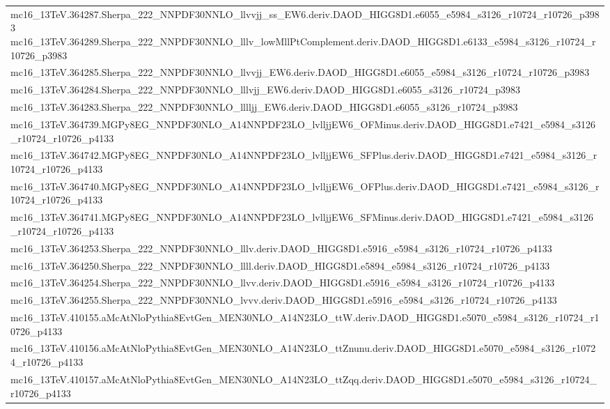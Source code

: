 \begin{adjustwidth}{-3em}{-3em}
\begin{longtable}{l}
mc16\_13TeV.364287.Sherpa\_222\_NNPDF30NNLO\_llvvjj\_ss\_EW6.deriv.DAOD\_HIGG8D1.e6055\_e5984\_s3126\_r10724\_r10726\_p3983
mc16\_13TeV.364289.Sherpa\_222\_NNPDF30NNLO\_lllv\_lowMllPtComplement.deriv.DAOD\_HIGG8D1.e6133\_e5984\_s3126\_r10724\_r10726\_p3983 \\
mc16\_13TeV.364285.Sherpa\_222\_NNPDF30NNLO\_llvvjj\_EW6.deriv.DAOD\_HIGG8D1.e6055\_e5984\_s3126\_r10724\_r10726\_p3983 \\
mc16\_13TeV.364284.Sherpa\_222\_NNPDF30NNLO\_lllvjj\_EW6.deriv.DAOD\_HIGG8D1.e6055\_s3126\_r10724\_p3983 \\
mc16\_13TeV.364283.Sherpa\_222\_NNPDF30NNLO\_lllljj\_EW6.deriv.DAOD\_HIGG8D1.e6055\_s3126\_r10724\_p3983 \\
mc16\_13TeV.364739.MGPy8EG\_NNPDF30NLO\_A14NNPDF23LO\_lvlljjEW6\_OFMinus.deriv.DAOD\_HIGG8D1.e7421\_e5984\_s3126\_r10724\_r10726\_p4133 \\
mc16\_13TeV.364742.MGPy8EG\_NNPDF30NLO\_A14NNPDF23LO\_lvlljjEW6\_SFPlus.deriv.DAOD\_HIGG8D1.e7421\_e5984\_s3126\_r10724\_r10726\_p4133 \\
mc16\_13TeV.364740.MGPy8EG\_NNPDF30NLO\_A14NNPDF23LO\_lvlljjEW6\_OFPlus.deriv.DAOD\_HIGG8D1.e7421\_e5984\_s3126\_r10724\_r10726\_p4133 \\
mc16\_13TeV.364741.MGPy8EG\_NNPDF30NLO\_A14NNPDF23LO\_lvlljjEW6\_SFMinus.deriv.DAOD\_HIGG8D1.e7421\_e5984\_s3126\_r10724\_r10726\_p4133 \\
mc16\_13TeV.364253.Sherpa\_222\_NNPDF30NNLO\_lllv.deriv.DAOD\_HIGG8D1.e5916\_e5984\_s3126\_r10724\_r10726\_p4133 \\
mc16\_13TeV.364250.Sherpa\_222\_NNPDF30NNLO\_llll.deriv.DAOD\_HIGG8D1.e5894\_e5984\_s3126\_r10724\_r10726\_p4133 \\
mc16\_13TeV.364254.Sherpa\_222\_NNPDF30NNLO\_llvv.deriv.DAOD\_HIGG8D1.e5916\_e5984\_s3126\_r10724\_r10726\_p4133 \\
mc16\_13TeV.364255.Sherpa\_222\_NNPDF30NNLO\_lvvv.deriv.DAOD\_HIGG8D1.e5916\_e5984\_s3126\_r10724\_r10726\_p4133 \\
mc16\_13TeV.410155.aMcAtNloPythia8EvtGen\_MEN30NLO\_A14N23LO\_ttW.deriv.DAOD\_HIGG8D1.e5070\_e5984\_s3126\_r10724\_r10726\_p4133 \\
mc16\_13TeV.410156.aMcAtNloPythia8EvtGen\_MEN30NLO\_A14N23LO\_ttZnunu.deriv.DAOD\_HIGG8D1.e5070\_e5984\_s3126\_r10724\_r10726\_p4133 \\
mc16\_13TeV.410157.aMcAtNloPythia8EvtGen\_MEN30NLO\_A14N23LO\_ttZqq.deriv.DAOD\_HIGG8D1.e5070\_e5984\_s3126\_r10724\_r10726\_p4133 \\

\end{longtable}
\end{adjustwidth}
